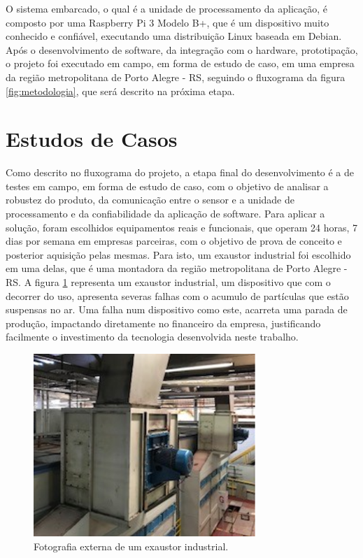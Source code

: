 O sistema embarcado, o qual é a unidade de processamento da aplicação, é composto por uma Raspberry Pi 3 Modelo B+, que é um dispositivo muito 
conhecido e confiável, executando uma distribuição Linux baseada em Debian. Após o desenvolvimento de software, da integração com o hardware, 
prototipação, o projeto foi executado em campo, em forma de estudo de caso, em uma empresa da região metropolitana de Porto Alegre - RS, seguindo o fluxograma da 
figura \ref{fig:metodologia}, que será descrito na próxima etapa.

% 

\section{Estudos de Casos}


Como descrito no fluxograma do projeto, a etapa final do desenvolvimento é a de testes em campo, em forma de estudo de caso, com o objetivo 
de analisar a robustez do produto, da comunicação entre o sensor e a unidade de processamento e da confiabilidade da aplicação de software. 
Para aplicar a solução, foram escolhidos equipamentos reais e funcionais, que operam 24 horas, 7 dias por semana em empresas parceiras,
com o objetivo de prova de conceito e posterior aquisição pelas mesmas. Para isto, um exaustor industrial foi escolhido em uma delas, que é 
uma montadora da região metropolitana de Porto Alegre - RS. A figura \ref{fig:exautor} representa um exaustor industrial, um dispositivo que com o decorrer do uso, apresenta severas falhas com o acumulo 
de partículas que estão suspensas no ar. Uma falha num dispositivo como este, acarreta uma parada de  produção, impactando diretamente no 
financeiro da empresa, justificando facilmente o investimento da tecnologia desenvolvida neste trabalho.

\begin{figure}[H]
    \caption{Fotografia externa de um exaustor industrial.}
    \begin{center}
        \includegraphics[scale=1.25]{metodologia/img/exaustor.png}
    \end{center}
    \label{fig:exautor}
\end{figure}

